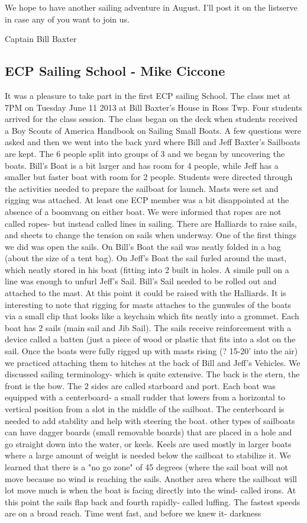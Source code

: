 \documentclass[10pt,a4paper]{article}
\newcommand\subsect[1]{%
  \subsection*{#1}%
  \addcontentsline{toc}{subsection}{#1}}
\begin{document}
\begin{multicols}{2}
We hope to have another sailing adventure in August.  I'll post it on the listserve in case any of you want to join us.

Captain Bill Baxter

\subsect{ECP Sailing School - Mike Ciccone}
It was a pleasure to take part in the first ECP sailing School.  The class met at 7PM on Tuesday June 11 2013 at Bill Baxter's House in Ross Twp.  Four students arrived for the class session.  The class began on the deck when students received a Boy Scouts of America Handbook on Sailing Small Boats.  A few questions were asked and then we went into the back yard where Bill and Jeff Baxter's Sailboats are kept.  The 6 people split into groups of 3 and we began by uncovering the boats.  Bill's Boat is a bit larger and has room for 4 people, while Jeff has a smaller but faster boat with room for 2 people.  Students were directed through the activities needed to prepare the sailboat for launch.  Masts were set and rigging was attached.  At least one ECP member was a bit disappointed at the absence of a boomvang on either boat.  We were informed that ropes are not called ropes- but instead called lines in sailing.  There are Halliards to raise sails, and sheets to change the tension on sails when underway.  One of the first things we did was open the sails.  On Bill's Boat the sail was neatly folded in a bag (about the size of a tent bag).  On Jeff's Boat the sail furled around the mast, which neatly stored in his boat (fitting into 2 built in holes.  A simile pull on a line was enough to unfurl Jeff's Sail.  Bill's Sail needed to be rolled out and attached to the mast.  At this point it could be raised with the Halliards.  It is interesting to note that rigging for masts attaches to the gunwales of the boats via a small clip that looks like a keychain which fits neatly into a grommet.  Each boat has 2 sails (main sail and Jib Sail).  The sails receive reinforcement with a device called a batten (just a piece of wood or plastic that fits into a slot on the sail.  Once the boats were fully rigged up with masts rising (? 15-20' into the air) we practiced attaching them to hitches at the back of Bill and Jeff's Vehicles.  We discussed sailing terminology- which is quite extensive.  The back is the stern, the front is the bow.  The 2 sides are called starboard and port.  Each boat was equipped with a centerboard- a small rudder that lowers from a horizontal to vertical position from a slot in the middle of the sailboat.  The centerboard is needed to add stability and help with steering the boat.  other types of sailboats can have dagger boards (small removable boards) that are placed in a hole and go straight down into the water, or keels.  Keels are used mostly in larger boats where a large amount of weight is needed below the sailboat to stabilize it.  We learned that there is a "no go zone" of 45 degrees (where the sail boat will not move because no wind is reaching the sails.  Another area where the sailboat will lot move much is when the boat is facing directly into the wind- called irons.  At this point the sails flap back and fourth rapidly- called luffing.  The fastest speeds are on a broad reach.  Time went fast, and before we knew it- darkness 
\end{multicols}
\end{document}
